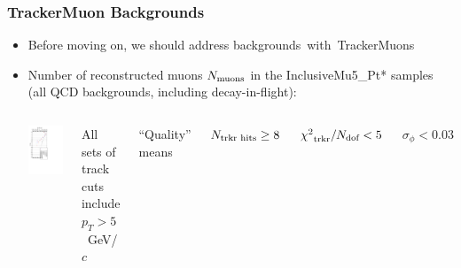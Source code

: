 \documentclass[compress]{beamer}
\newcommand{\s}[1]{{\mbox{\scriptsize #1}}}
\begin{document}
\begin{frame}
\frametitle{TrackerMuon Backgrounds}
\begin{itemize}
\item Before moving on, we should address \mbox{backgrounds with TrackerMuons\hspace{-1 cm}}
\item Number of reconstructed muons $N_\s{muons}$ in the InclusiveMu5\_Pt* samples (all QCD backgrounds, including decay-in-flight):

\begin{center}
\begin{columns}
\includegraphics[height=\linewidth, angle=90]{tracks_samepage_allreal.pdf}

\scriptsize All sets of track cuts include $p_T > 5$~GeV/$c$

\vspace{0.25 cm}
``Quality'' means

\vspace{0.1 cm}
$N_\s{trkr hits} \ge 8$

\vspace{0.1 cm}
${\chi^2}_\s{trkr}/N_\s{dof} < 5$

\vspace{0.1 cm}
$\sigma_\phi < 0.03$


\end{columns}
\end{center}
\end{itemize}
\end{frame}
\end{document}
